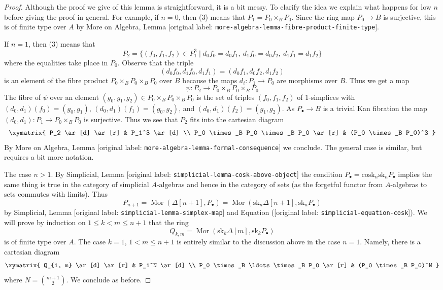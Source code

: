 \documentclass[10pt,a4paper]{article}
\theoremstyle{plain}
\theoremstyle{definition}
\theoremstyle{remark}
\numberwithin{equation}{subsection}
\def\Mor{\mathop{\mathrm{Mor}}\nolimits}
\begin{document}
\begin{proof}
Although the proof we give of this lemma is straightforward, it is a bit
messy. To clarify the idea we explain what happens for low $n$ before giving
the proof in general. For example, if $n = 0$, then (3) means that
$P_1 = P_0 \times_B P_0$. Since the ring map $P_0 \to B$ is surjective, this
is of finite type over $A$ by
More on Algebra, Lemma \textnormal{[original label: \nolinkurl{more-algebra-lemma-fibre-product-finite-type}]}.

\medskip\noindent
If $n = 1$, then (3) means that
$$
P_2 = \{(f_0, f_1, f_2) \in P_1^3 \mid
d_0f_0 = d_0f_1,\ d_1f_0 = d_0f_2,\ d_1f_1 = d_1f_2 \}
$$
where the equalities take place in $P_0$. Observe that the triple
$$
(d_0f_0, d_1f_0, d_1f_1) = (d_0f_1, d_0f_2, d_1f_2)
$$
is an element of the fibre product $P_0 \times_B P_0 \times_B P_0$ over $B$
because the maps $d_i : P_1 \to P_0$ are morphisms over $B$. Thus we get
a map
$$
\psi : P_2 \longrightarrow P_0 \times_B P_0 \times_B P_0
$$
The fibre of $\psi$ over an element
$(g_0, g_1, g_2) \in P_0 \times_B P_0 \times_B P_0$
is the set of triples $(f_0, f_1, f_2)$ of $1$-simplices
with $(d_0, d_1)(f_0) = (g_0, g_1)$, $(d_0, d_1)(f_1) = (g_0, g_2)$,
and $(d_0, d_1)(f_2) = (g_1, g_2)$. As $P_\bullet \to B$ is a trivial
Kan fibration the map $(d_0, d_1) : P_1 \to P_0 \times_B P_0$ is
surjective. Thus we see that $P_2$ fits into the cartesian diagram
$$
\xymatrix{
P_2 \ar[d] \ar[r] & P_1^3 \ar[d] \\
P_0 \times_B P_0 \times_B P_0 \ar[r] & (P_0 \times_B P_0)^3
}
$$
By More on Algebra, Lemma \textnormal{[original label: \nolinkurl{more-algebra-lemma-formal-consequence}]}
we conclude. The general case is similar, but requires a bit more notation.

\medskip\noindent
The case $n > 1$. By Simplicial, Lemma \textnormal{[original label: \nolinkurl{simplicial-lemma-cosk-above-object}]}
the condition $P_\bullet = \text{cosk}_n \text{sk}_n P_\bullet$
implies the same thing is true in the category of simplicial
$A$-algebras and hence in the category of sets (as the forgetful
functor from $A$-algebras to sets commutes with limits). Thus
$$
P_{n + 1} =
\Mor(\Delta[n + 1], P_\bullet) =
\Mor(\text{sk}_n \Delta[n + 1], \text{sk}_n P_\bullet)
$$
by Simplicial, Lemma \textnormal{[original label: \nolinkurl{simplicial-lemma-simplex-map}]} and
Equation (\textnormal{[original label: \nolinkurl{simplicial-equation-cosk}]}). We will prove by induction
on $1 \leq k < m \leq n + 1$ that the ring
$$
Q_{k, m} = \Mor(\text{sk}_k \Delta[m], \text{sk}_k P_\bullet)
$$
is of finite type over $A$. The case $k = 1$, $1 < m \leq n + 1$
is entirely similar to the discussion above in the case $n = 1$.
Namely, there is a cartesian diagram
$$
\xymatrix{
Q_{1, m} \ar[d] \ar[r] & P_1^N \ar[d] \\
P_0 \times_B \ldots \times_B P_0 \ar[r] & (P_0 \times_B P_0)^N
}
$$
where $N = {m + 1 \choose 2}$. We conclude as before.


\end{proof}
\end{document}
